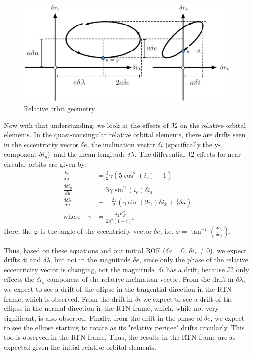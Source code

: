 \begin{figure}[H]
    \centering
    \includegraphics[width=0.75\linewidth]{LaTeX/Figures/RelOrbitGeometry.jpg}
    \caption{Relative orbit geometry}
    \label{fig:rel_geometry}
\end{figure}

Now with that understanding, we look at the effects of J2 on the relative orbital elements. In the quasi-nonsingular relative orbital elements, there are drifts seen in the eccentricity vector $\delta e$, the inclination vector $\delta i$ (specifically the y-component $\delta i_y$), and the mean longitude $\delta \lambda$. The differential J2 effects for near-circular orbits are given by:
\begin{align}
    \frac{d \varphi}{d u} &= \frac{3}{2} \gamma (5\cos^2(i_c) - 1) \\
    \frac{d \delta i_y}{d u} &= 3\gamma \sin^2(i_c) \delta i_x \label{eq:drift_in_rel_i} \\
    \frac{d \delta \lambda}{d u} &= -\frac{21}{2}\left(\gamma \sin(2i_c)\delta i_x 
+ \frac{1}{7} \delta a\right) \label{eq:drift_in_lambda_rel}\\
    \text{where} \quad \gamma  &= \frac{J_2 R_E^2}{2 a^2 (1 - e)^2}
\end{align}
Here, the $\varphi$ is the angle of the eccentricity vector $\delta e$, i.e. $\varphi = \tan^{-1}\left(\frac{\delta e_y}{\delta e_x}\right)$.

Thus, based on these equations and our initial ROE ($\delta a = 0$, $\delta i_x \neq 0$), we expect drifts $\delta i$ and $\delta \lambda$, but not in the magnitude $\delta e$, since only the phase of the relative eccentricity vector is changing, not the magnitude. $\delta i$ has a drift, because J2 only effects the $\delta i_y$ component of the relative inclination vector. From the drift in $\delta \lambda$, we expect to see a drift of the ellipse in the tangential direction in the RTN frame, which is observed. From the drift in $\delta i$ we expect to see a drift of the ellipse in the normal direction in the RTN frame, which, while not very significant, is also observed. Finally, from the drift in the phase of $\delta e$, we expect to see the ellipse starting to rotate as its "relative perigee" drifts circularly. This too is observed in the RTN frame. Thus, the results in the RTN frame are as expected given the initial relative orbital elements. 


